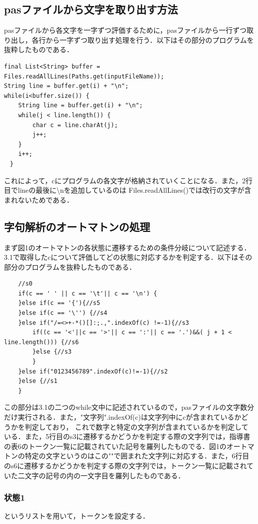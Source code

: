 \documentclass[dvipdfmx]{jarticle}
\begin{document}
\subsection{pasファイルから文字を取り出す方法}
pasファイルから各文字を一字ずつ評価するために，pasファイルから一行ずつ取り出し，各行から一字ずつ取り出す処理を行う．以下はその部分のプログラムを抜粋したものである．
\begin{lstlisting}
final List<String> buffer = Files.readAllLines(Paths.get(inputFileName));
String line = buffer.get(i) + "\n";
while(i<buffer.size()) {
    String line = buffer.get(i) + "\n";
    while(j < line.length()) {
        char c = line.charAt(j);
        j++;
    }			
    i++;
　}
\end{lstlisting}
これによって，cにプログラムの各文字が格納されていくことになる．また，2行目でlineの最後に\textbackslash nを追加しているのは
Files.readAllLines()では改行の文字が含まれないためである．
\subsection{字句解析のオートマトンの処理}
まず図1のオートマトンの各状態に遷移するための条件分岐について記述する．3.1で取得したcについて評価してどの状態に対応するかを判定する．以下はその部分のプログラムを抜粋したものである．
\begin{lstlisting}
    //s0
    if(c == ' ' || c == '\t'|| c == '\n') {
    }else if(c == '{'){//s5
    }else if(c == '\'') {//s4
    }else if("/=<>+-*()[]:;.,".indexOf(c) !=-1){//s3
        if((c == '<'||c == '>'|| c == ':'|| c == '.')&&( j + 1 < line.length())) {//s6
        }else {//s3
        }
    }else if("0123456789".indexOf(c)!=-1){//s2
    }else {//s1
    }
\end{lstlisting}
この部分は3.1の二つのwhile文中に記述されているので，pasファイルの文字数分だけ実行される．また，"文字列".indexOf(c)は文字列中にcが含まれているかどうかを判定しており，
これで数字と特定の文字列が含まれているかを判定している．また，5行目のs3に遷移するかどうかを判定する際の文字列では，指導書の表6のトークン一覧に記載されていた記号を羅列したものでる．図1のオートマトンの特定の文字というのはこの""で囲まれた文字列に対応する．また，6行目のs6に遷移するかどうかを判定する際の文字列では，トークン一覧に記載されていた二文字の記号の内の一文字目を羅列したものである．
\subsubsection{状態1}
というリストを用いて，トークンを設定する．
\end{document}
